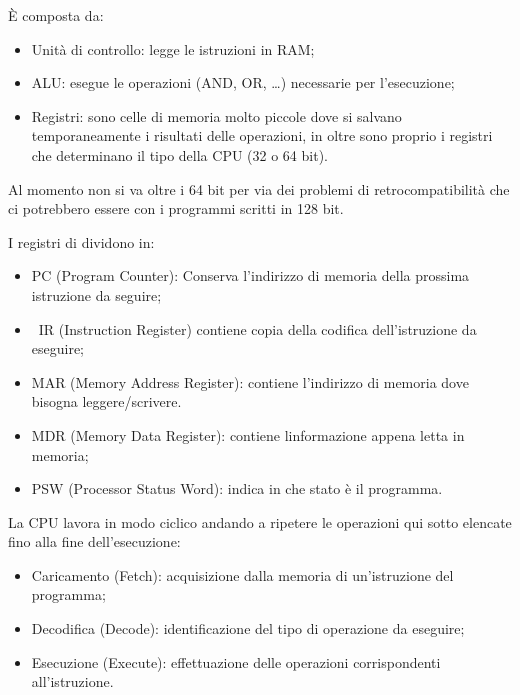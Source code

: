 \documentclass[
]{article}
\providecommand{\tightlist}{%
  \setlength{\itemsep}{0pt}\setlength{\parskip}{0pt}}
\begin{document}
{}

{È composta da:}

\begin{itemize}
\tightlist
\item
  {Unità di controllo}{: legge le istruzioni in RAM;}
\item
  {ALU}{: esegue le operazioni (AND, OR, \ldots) necessarie per
  l'esecuzione;}
\item
  {Registri}{: sono celle di memoria molto piccole dove si salvano
  temporaneamente i risultati delle operazioni, in oltre sono proprio i
  registri che determinano il tipo della CPU (32 o 64 bit).}
\end{itemize}

{Al momento non si va oltre i 64 bit per via dei problemi di
retrocompatibilità che ci potrebbero essere con i programmi scritti in
128 bit.}

{I registri di dividono in:}

\begin{itemize}
\tightlist
\item
  {PC }{(Program Counter): Conserva l'indirizzo di memoria della
  prossima istruzione da seguire;}
\item
  {~}{IR }{(Instruction Register) contiene copia della codifica
  dell'istruzione da eseguire;}
\item
  {MAR }{(Memory Address Register): contiene l'indirizzo di memoria dove
  bisogna leggere/scrivere.}
\item
  {MDR }{(Memory Data Register): contiene l\textquotesingle informazione
  appena letta in memoria;}
\item
  {PSW }{(Processor Status Word): indica in che stato è il programma.}
\end{itemize}

{}

{La CPU lavora in modo ciclico andando a ripetere le operazioni qui
sotto elencate fino alla fine dell'esecuzione:}

\begin{itemize}
\tightlist
\item
  {Caricamento }{(}{Fetch}{): acquisizione dalla memoria di
  un'istruzione del programma;}
\item
  {Decodifica }{(}{Decode}{): identificazione del tipo di operazione da
  eseguire;}
\item
  {Esecuzione }{(}{Execute}{): effettuazione delle operazioni
  corrispondenti all'istruzione.}
\end{itemize}
\end{document}
